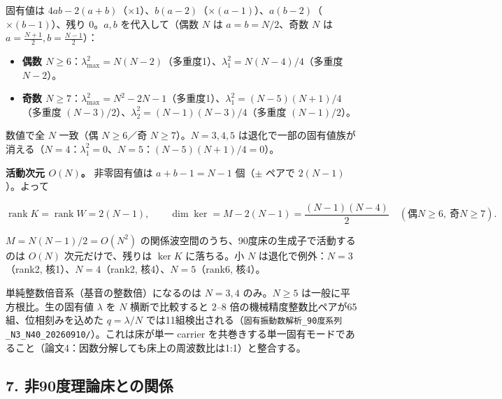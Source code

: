 \documentclass[
  a4paper,
]{ltjsarticle}
\providecommand{\tightlist}{%
  \setlength{\itemsep}{0pt}\setlength{\parskip}{0pt}}
\begin{document}
固有値は
\(4ab-2(a+b)\)（\(\times1\)）、\(b(a-2)\)（\(\times(a-1)\)）、\(a(b-2)\)（\(\times(b-1)\)）、残り
\(0\)。\(a,b\) を代入して（偶数 \(N\) は \(a=b=N/2\)、奇数 \(N\) は
\(a=\tfrac{N+1}2,b=\tfrac{N-1}2\)）：

\begin{itemize}
\tightlist
\item
  \textbf{偶数
  \(N\ge6\)}：\(\lambda_{\max}^2=N(N-2)\)（多重度1）、\(\lambda_1^2=N(N-4)/4\)（多重度
  \(N-2\)）。
\item
  \textbf{奇数
  \(N\ge7\)}：\(\lambda_{\max}^2=N^2-2N-1\)（多重度1）、\(\lambda_1^2=(N-5)(N+1)/4\)（多重度
  \((N-3)/2\)）、\(\lambda_2^2=(N-1)(N-3)/4\)（多重度 \((N-1)/2\)）。
\end{itemize}

数値で全 \(N\) 一致（偶 \(N\ge6\)／奇 \(N\ge7\)）。\(N=3,4,5\)
は退化で一部の固有値族が消える（\(N=4\)：\(\lambda_1^2=0\)、\(N=5\)：\((N-5)(N+1)/4=0\)）。

\textbf{活動次元 \(O(N)\)。} 非零固有値は \(a+b-1=N-1\) 個（\(\pm\)
ペアで \(2(N-1)\)）。よって

\[\operatorname{rank}K=\operatorname{rank}W=2(N-1),\qquad \dim\ker=M-2(N-1)=\frac{(N-1)(N-4)}2\quad(\text{偶}N\ge6,\ \text{奇}N\ge7).\]

\(M=N(N-1)/2=O(N^2)\) の関係波空間のうち、90度床の生成子で活動するのは
\(O(N)\) 次元だけで、残りは \(\ker K\) に落ちる。小 \(N\)
は退化で例外：\(N=3\)（rank2, 核1）、\(N=4\)（rank2,
核4）、\(N=5\)（rank6, 核4）。

単純整数倍音系（基音の整数倍）になるのは \(N=3,4\) のみ。\(N\ge5\)
は一般に平方根比。生の固有値 \(\lambda\) を \(N\) 横断で比較すると
\(2\)--\(8\) 倍の機械精度整数比ペアが65組、位相刻みを込めた
\(q=\lambda/N\)
では11組検出される（\texttt{固有振動数解析\_90度系列\_N3\_N40\_20260910/}）。これは床が単一
carrier
を共巻きする単一固有モードであること（論文4：因数分解しても床上の周波数比は1:1）と整合する。

\subsection{7.
非90度理論床との関係}\label{ux975e90ux5ea6ux7406ux8ad6ux5e8aux3068ux306eux95a2ux4fc2}
\end{document}
